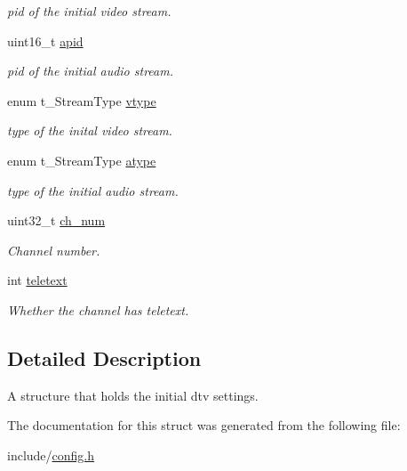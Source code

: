 \begin{DoxyCompactItemize}
\begin{DoxyCompactList}\small\item\em pid of the initial video stream. \end{DoxyCompactList}\item 
uint16\+\_\+t \hyperlink{structconfig__init__ch__info_ad3e02f3dab113c0c9754183d847f82fe}{apid}\hypertarget{structconfig__init__ch__info_ad3e02f3dab113c0c9754183d847f82fe}{}\label{structconfig__init__ch__info_ad3e02f3dab113c0c9754183d847f82fe}

\begin{DoxyCompactList}\small\item\em pid of the initial audio stream. \end{DoxyCompactList}\item 
enum t\+\_\+\+Stream\+Type \hyperlink{structconfig__init__ch__info_ab41965db2e503fc08327aa8f389be804}{vtype}\hypertarget{structconfig__init__ch__info_ab41965db2e503fc08327aa8f389be804}{}\label{structconfig__init__ch__info_ab41965db2e503fc08327aa8f389be804}

\begin{DoxyCompactList}\small\item\em type of the inital video stream. \end{DoxyCompactList}\item 
enum t\+\_\+\+Stream\+Type \hyperlink{structconfig__init__ch__info_a7bbc55cdffa6b7df3235f49393d51c4b}{atype}\hypertarget{structconfig__init__ch__info_a7bbc55cdffa6b7df3235f49393d51c4b}{}\label{structconfig__init__ch__info_a7bbc55cdffa6b7df3235f49393d51c4b}

\begin{DoxyCompactList}\small\item\em type of the initial audio stream. \end{DoxyCompactList}\item 
uint32\+\_\+t \hyperlink{structconfig__init__ch__info_a7584861f004ba6d994cd6439f30ab229}{ch\+\_\+num}\hypertarget{structconfig__init__ch__info_a7584861f004ba6d994cd6439f30ab229}{}\label{structconfig__init__ch__info_a7584861f004ba6d994cd6439f30ab229}

\begin{DoxyCompactList}\small\item\em Channel number. \end{DoxyCompactList}\item 
int \hyperlink{structconfig__init__ch__info_a2fc9c04b18d19a87322801d5e0429005}{teletext}\hypertarget{structconfig__init__ch__info_a2fc9c04b18d19a87322801d5e0429005}{}\label{structconfig__init__ch__info_a2fc9c04b18d19a87322801d5e0429005}

\begin{DoxyCompactList}\small\item\em Whether the channel has teletext. \end{DoxyCompactList}\end{DoxyCompactItemize}


\subsection{Detailed Description}
A structure that holds the initial dtv settings. 

The documentation for this struct was generated from the following file\+:\begin{DoxyCompactItemize}
\item 
include/\hyperlink{config_8h}{config.\+h}\end{DoxyCompactItemize}
